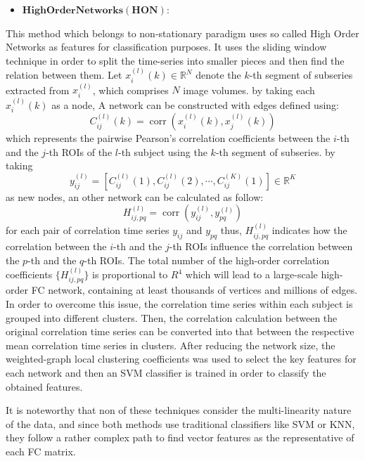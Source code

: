 \documentclass[journal]{IEEEtran}
\begin{document}
	\begin{itemize}
		\item $\mathbf{High Order Networks(HON):}$
	\end{itemize}
 This method which belongs to non-stationary paradigm uses so called
	 High Order Networks as features for classification purposes. It uses the sliding window technique  in order to split the time-series into smaller pieces and then find the relation between them\cite{r51}\textendash \cite{r52}. Let $x_{i}^{(l)}(k) \in \mathbb{R}^N$ denote the $k$-th segment of subseries extracted from $x_{i}^{(l)}$, which comprises $N$ image volumes. by taking each $x_{i}^{(l)}(k)$ as a node, A network can be constructed with edges defined using:
	\[
	C_{ij}^{(l)}(k) = \operatorname{corr}\left(x_{i}^{(l)}(k),x_{j}^{(l)}(k)
	\right)
	\]
	which represents the pairwise Pearson’s correlation coefficients
	between the $i$-th and the $j$-th ROIs of the $l$-th subject using the $k$-th segment of subseries. 
	by taking  
	\[
	y_{ij}^{(l)} = \left[ 
	C_{ij}^{(l)}(1), C_{ij}^{(l)}(2), \cdots , C_{ij}^{(K)}(1) 
	\right] \in \mathbb{R}^K
	\]
	as new nodes, an other network can be calculated as follow: 
	\[
	H_{ij,pq}^{(l)} = \operatorname{corr} \left(
	y_{ij}^{(l)},y_{pq}^{(l)}
	\right)
	\]
	for each pair of correlation time series $y_{ij}$ and $y_{pq}$ thus, $H_{ij,pq}^{(l)}$ indicates how the correlation between the $i$-th and the $j$-th ROIs influence the correlation between the $p$-th and the $q$-th ROIs.
	The total number of the high-order correlation coefficients
	$\{ H_{ij,pq}^{(l)} \}$ is proportional to $R^4$ which will lead to a large-scale high-order FC
	network, containing at least thousands of vertices and millions
	of edges. In order to overcome this issue, the correlation time series within each subject is grouped into different clusters. Then, the correlation calculation
	between the original correlation time series can be
	converted into that between the respective mean correlation
	time series in clusters. After reducing the network size, the
	weighted-graph local clustering coefficients was used to select the key features for each network and then an SVM classifier is trained in order to classify the obtained features.  
	
	It is noteworthy that non of these techniques consider the multi-linearity nature of the data, and since both methods use traditional classifiers like SVM or KNN, they follow a rather complex path to find vector features as the representative of each FC matrix.
	
\end{document}
